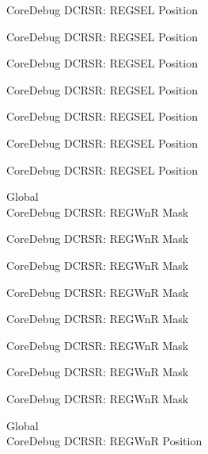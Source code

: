 \begin{DoxyRefList}
\label{deprecated__deprecated000131}%
%
Core\+Debug DCRSR\+: REGSEL Position 

\label{deprecated__deprecated000187}%
%
Core\+Debug DCRSR\+: REGSEL Position 

\label{deprecated__deprecated000270}%
%
Core\+Debug DCRSR\+: REGSEL Position 

\label{deprecated__deprecated000329}%
%
Core\+Debug DCRSR\+: REGSEL Position 

\label{deprecated__deprecated000405}%
%
Core\+Debug DCRSR\+: REGSEL Position 

\label{deprecated__deprecated000494}%
%
Core\+Debug DCRSR\+: REGSEL Position 

\label{deprecated__deprecated000596}%
%
Core\+Debug DCRSR\+: REGSEL Position  
\item[Global \doxylink{group___c_m_s_i_s___core_debug_ga1eef4992d8f84bc6c0dffed1c87f90a5}{Core\+Debug\+\_\+\+DCRSR\+\_\+\+REGWn\+R\+\_\+\+Msk} ]\hfill \\
\label{deprecated__deprecated000042}%
%
Core\+Debug DCRSR\+: REGWnR Mask 

\label{deprecated__deprecated000130}%
%
Core\+Debug DCRSR\+: REGWnR Mask 

\label{deprecated__deprecated000186}%
%
Core\+Debug DCRSR\+: REGWnR Mask 

\label{deprecated__deprecated000269}%
%
Core\+Debug DCRSR\+: REGWnR Mask 

\label{deprecated__deprecated000328}%
%
Core\+Debug DCRSR\+: REGWnR Mask 

\label{deprecated__deprecated000404}%
%
Core\+Debug DCRSR\+: REGWnR Mask 

\label{deprecated__deprecated000493}%
%
Core\+Debug DCRSR\+: REGWnR Mask 

\label{deprecated__deprecated000595}%
%
Core\+Debug DCRSR\+: REGWnR Mask  
\item[Global \doxylink{group___c_m_s_i_s___core_debug_ga51e75942fc0614bc9bb2c0e96fcdda9a}{Core\+Debug\+\_\+\+DCRSR\+\_\+\+REGWn\+R\+\_\+\+Pos} ]\hfill \\
\label{deprecated__deprecated000041}%
%
Core\+Debug DCRSR\+: REGWnR Position 


\end{DoxyRefList}
